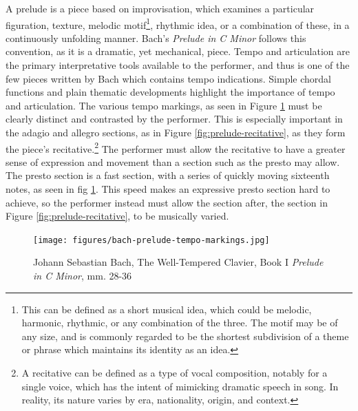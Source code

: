 A prelude is a piece based on improvisation, which examines a particular figuration, texture, melodic motif\autocite{Drabkin_2001}\footnote{This can be defined as a short musical idea, which could be melodic, harmonic, rhythmic, or any combination of the three. The motif may be of any size, and is commonly regarded to be the shortest subdivision of a theme or phrase which maintains its identity as an idea.}, rhythmic idea, or a combination of these, in a continuously unfolding manner. Bach's \textit{Prelude in C Minor} follows this convention, as it is a dramatic, yet mechanical, piece. Tempo and articulation are the primary interpretative tools available to the performer, and thus is one of the few pieces written by Bach which contains tempo indications. Simple chordal functions and plain thematic developments highlight the importance of tempo and articulation. The various tempo markings, as seen in Figure \ref{fig:prelude-tempo-markings}\autocite{Henle_2009} must be clearly distinct and contrasted by the performer. This is especially important in the adagio and allegro sections, as in Figure \ref{fig:prelude-recitative}\autocite{Henle_2009},
as they form the piece's recitative.\footnote{A recitative can be defined as a type of vocal composition, notably for a single voice, which has the intent of mimicking dramatic speech in song. In reality, its nature varies by era, nationality, origin, and context.}\autocite{Monson_Westrup_Budden_2001} The performer must allow the recitative to have a greater sense of expression and movement than a section such as the presto may allow. The presto section is a fast section, with a series of quickly moving sixteenth notes, as seen in fig \ref{fig:prelude-tempo-markings}\autocite{Henle_2009}. This speed makes an expressive presto section hard to achieve, so the performer instead must allow the section after, the section in Figure \ref{fig:prelude-recitative}\autocite{Henle_2009}, to be musically varied. 

\begin{figure}
    \centering
    \texttt{[image: figures/bach-prelude-tempo-markings.jpg]}
    \caption{Johann Sebastian Bach, The Well-Tempered Clavier, Book I \textit{Prelude in C Minor}, mm. 28-36}
    \label{fig:prelude-tempo-markings}
\end{figure}

